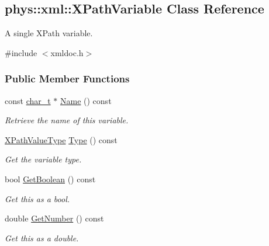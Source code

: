 \hypertarget{classphys_1_1xml_1_1XPathVariable}{
\subsection{phys::xml::XPathVariable Class Reference}
\label{df/dee/classphys_1_1xml_1_1XPathVariable}
}


A single XPath variable.  




{\ttfamily \#include $<$xmldoc.h$>$}

\subsubsection*{Public Member Functions}
\begin{DoxyCompactItemize}
\item 
const \hyperlink{namespacephys_1_1xml_afc87705cd1c2917d87b879715a2d8f6e}{char\_\-t} $\ast$ \hyperlink{classphys_1_1xml_1_1XPathVariable_adeecf4d048c98de6fe7e9fcdb7174bcc}{Name} () const 
\begin{DoxyCompactList}\small\item\em Retrieve the name of this variable. \item\end{DoxyCompactList}\item 
\hyperlink{namespacephys_1_1xml_a339b9eef674ba44100110e5524bc575d}{XPathValueType} \hyperlink{classphys_1_1xml_1_1XPathVariable_a6c2986292fe674b79ea9dbf261c4a96f}{Type} () const 
\begin{DoxyCompactList}\small\item\em Get the variable type. \item\end{DoxyCompactList}\item 
bool \hyperlink{classphys_1_1xml_1_1XPathVariable_ade5e5da86817afc6fafd64d4f9b21e9c}{GetBoolean} () const 
\begin{DoxyCompactList}\small\item\em Get this as a bool. \item\end{DoxyCompactList}\item 
double \hyperlink{classphys_1_1xml_1_1XPathVariable_ac3798fc142b781c48bd694f1cdd386c4}{GetNumber} () const 
\begin{DoxyCompactList}\small\item\em Get this as a double. \item\end{DoxyCompactList}\item 

\end{DoxyCompactItemize}
